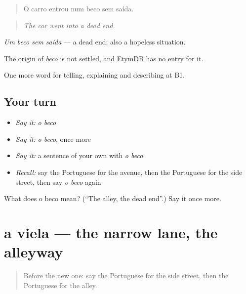 \begin{quote}
O carro entrou num beco sem saída.
\end{quote}

\begin{quote}
\emph{The car went into a dead end.}
\end{quote}

\emph{Um beco sem saída} — a dead end; also a hopeless situation.

\begin{cousinweb}
The origin of \emph{beco} is not settled, and EtymDB has no entry for it.
\end{cousinweb}

\begin{grammarlens}[title={What you've built}]
One more word for telling, explaining and describing at B1.
\end{grammarlens}

\subsection*{Your turn}
\begin{itemize}
\raggedright
  \item \emph{Say it:} \emph{o beco}
  \item \emph{Say it:} \emph{o beco}, once more
  \item \emph{Say it:} a sentence of your own with \emph{o beco}
  \item \emph{Recall:} say the Portuguese for the avenue, then the Portuguese for the side street, then say \emph{o beco} again
\end{itemize}

\begin{tcolorbox}[breakable,colback=teal!4,colframe=teal!35!black,title={Before you move on}]
What does o beco mean? (\textquotedblleft{}The alley, the dead end\textquotedblright{}.) Say it once more.
\end{tcolorbox}
\section[a viela]{a viela — the narrow lane, the alleyway}

\label{lesson:PT-C437-viela}



\begin{quote}
Before the new one: say the Portuguese for the side street, then the Portuguese for the alley.
\end{quote}

